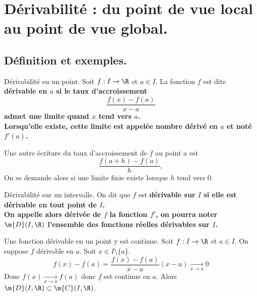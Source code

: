 \documentclass[11pt]{article}
\begin{document}


\thispagestyle{fancy}

\section{Dérivabilité : du point de vue local au point de vue global.}

\vspace*{0.4cm}

\subsection{Définition et exemples.}

\vspace*{0.4cm}

\begin{defi}{Dérivabilité en un point.}{}
    Soit $f:I\to\R$ et $a\in I$. La fonction $f$ est dite \bf{dérivable en $a$} si le taux d'accroissement
    \begin{equation*}
        \frac{f(x)-f(a)}{x-a}
    \end{equation*}
    admet une limite quand $x$ tend vers $a$.\\
    Lorsqu'elle existe, cette limite est appelée \bf{nombre dérivé} en $a$ et noté $f'(a)$.
\end{defi}

\vspace*{0.4cm}

Une autre écriture du taux d'accroissement de $f$ au point $a$ est
\begin{equation*}
    \frac{f(a+h)-f(a)}{h},
\end{equation*}
On se demande alors si une limite finie existe lorsque $h$ tend vers $0$.

\vspace*{0.8cm}

\begin{defi}{Dérivabilité sur un intervalle.}{}
    On dit que $f$ est \bf{dérivable sur $I$} si elle est dérivable en tout point de $I$.\\
    On appelle alors \bf{dérivée} de $f$ la fonction $f'$, on pourra noter $\m{D}(I,\R)$ l'ensemble des fonctions réelles dérivables sur $I$.
\end{defi}

\vspace*{0.4cm}

\begin{prop}{}{}
    Une fonction dérivable en un point y est continue.
    \tcblower
    Soit $f:I\to\R$ et $a\in I$. On suppose $f$ dérivable en $a$. Soit $x\in I\setminus\{a\}$.
    \begin{equation*}
        f(x)-f(a)=\frac{f(x)-f(a)}{x-a}(x-a)\xrightarrow[x\to a]{}0
    \end{equation*}
    Donc $f(x)\xrightarrow[x\to a]{}f(a)$ donc $f$ est continue en $a$. Alors $\m{D}(I,\R)\subset\m{C}(I,\R)$.
\end{prop}
\end{document}
